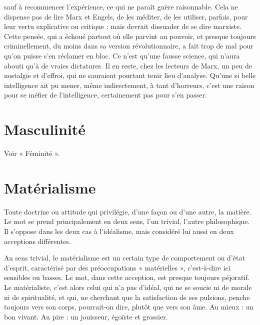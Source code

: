 sauf à recommencer l'expérience, ce qui ne paraît guère raisonnable. Cela ne
dispense pas de lire Marx et Engels, de les méditer, de les utiliser, parfois, pour
leur vertu explicative ou critique ; mais devrait dissuader de se dire marxiste.
Cette pensée, qui a échoué partout où elle parvint au pouvoir, et presque toujours
criminellement, du moins dans sa version révolutionnaire, a fait trop de
mal pour qu’on puisse s’en réclamer en bloc. Ce n’est qu’une fausse science, qui
n'aura abouti qu’à de vraies dictatures. Il en reste, chez les lecteurs de Marx, un
peu de nostalgie et d’effroi, qui ne sauraient pourtant tenir lieu d’analyse.
Qu’une si belle intelligence ait pu mener, même indirectement, à tant d’horreurs,
c’est une raison pour se méfier de l'intelligence, certainement pas pour
s’en passer.

\section{Masculinité}
Voir « Féminité ».

\section{Matérialisme}
Toute doctrine ou attitude qui privilégie, d’une façon ou
d’une autre, la matière. Le mot se prend principalement
en deux sens, l’un trivial, l’autre philosophique. Il s'oppose dans les deux cas à
l’idéalisme, mais considéré lui aussi en deux acceptions différentes.

Au sens trivial, le matérialisme est un certain type de comportement ou
d’état d’esprit, caractérisé par des préoccupations « matérielles », c’est-à-dire ici
sensibles ou basses. Le mot, dans cette acception, est presque toujours péjoratif.
Le matérialiste, c’est alors celui qui n’a pas d’idéal, qui ne se soucie ni de morale
ni de spiritualité, et qui, ne cherchant que la satisfaction de ses pulsions, penche
toujours vers son corps, pourrait-on dire, plutôt que vers son âme. Au mieux :
un bon vivant. Au pire : un jouisseur, égoïste et grossier.


